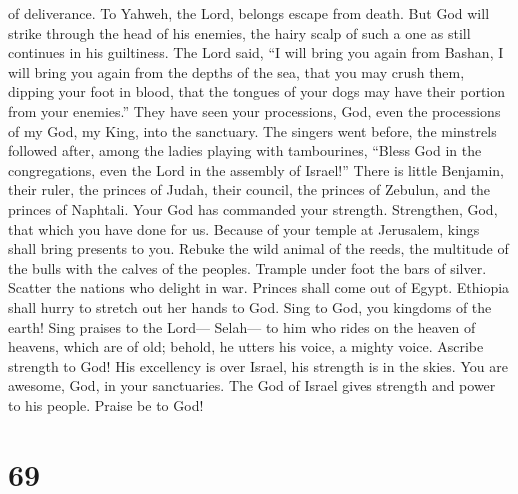 of deliverance. To Yahweh, the Lord, belongs escape from death.
 But God will strike through the head of his enemies, the
hairy scalp of such a one as still continues in his guiltiness.
 The Lord said, ``I will bring you again from Bashan, I
will bring you again from the depths of the sea,  that
you may crush them, dipping your foot in blood, that the tongues of your
dogs may have their portion from your enemies.''  They
have seen your processions, God, even the processions of my God, my
King, into the sanctuary.  The singers went before, the
minstrels followed after, among the ladies playing with tambourines,
 ``Bless God in the congregations, even the Lord in the
assembly of Israel!''  There is little Benjamin, their
ruler, the princes of Judah, their council, the princes of Zebulun, and
the princes of Naphtali.  Your God has commanded your
strength. Strengthen, God, that which you have done for us.
 Because of your temple at Jerusalem, kings shall bring
presents to you.  Rebuke the wild animal of the reeds,
the multitude of the bulls with the calves of the peoples. Trample under
foot the bars of silver. Scatter the nations who delight in war.
 Princes shall come out of Egypt. Ethiopia shall hurry to
stretch out her hands to God.  Sing to God, you kingdoms
of the earth! Sing praises to the Lord--- Selah---  to
him who rides on the heaven of heavens, which are of old; behold, he
utters his voice, a mighty voice.  Ascribe strength to
God! His excellency is over Israel, his strength is in the skies.
 You are awesome, God, in your sanctuaries. The God of
Israel gives strength and power to his people. Praise be to God!

\hypertarget{section-68}{%
\section{69}\label{section-68}}

